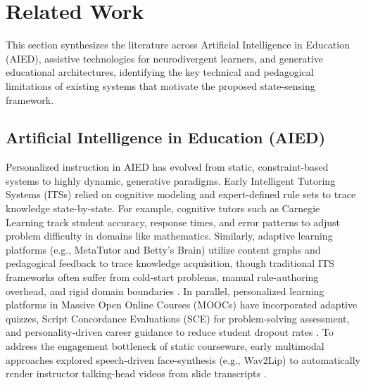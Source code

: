 
\section{Related Work}
\label{sec:related_work}

This section synthesizes the literature across Artificial Intelligence in Education (AIED), assistive technologies for neurodivergent learners, and generative educational architectures, identifying the key technical and pedagogical limitations of existing systems that motivate the proposed state-sensing framework.

\subsection{Artificial Intelligence in Education (AIED)}
\label{subsec:related_aied}

Personalized instruction in AIED has evolved from static, constraint-based systems to highly dynamic, generative paradigms. Early Intelligent Tutoring Systems (ITSs) relied on cognitive modeling and expert-defined rule sets to trace knowledge state-by-state. For example, cognitive tutors such as Carnegie Learning \cite{jier2025ai} track student accuracy, response times, and error patterns to adjust problem difficulty in domains like mathematics. Similarly, adaptive learning platforms (e.g., MetaTutor and Betty's Brain) \cite{laak2025ai} utilize content graphs and pedagogical feedback to trace knowledge acquisition, though traditional ITS frameworks often suffer from cold-start problems, manual rule-authoring overhead, and rigid domain boundaries \cite{vorobyeva2025personalized, etr2025artificial}. In parallel, personalized learning platforms in Massive Open Online Courses (MOOCs) have incorporated adaptive quizzes, Script Concordance Evaluations (SCE) for problem-solving assessment, and personality-driven career guidance to reduce student dropout rates \cite{vijayasekaran2024personalized}. To address the engagement bottleneck of static courseware, early multimodal approaches explored speech-driven face-synthesis (e.g., Wav2Lip) to automatically render instructor talking-head videos from slide transcripts \cite{dao2021aipowered}.


